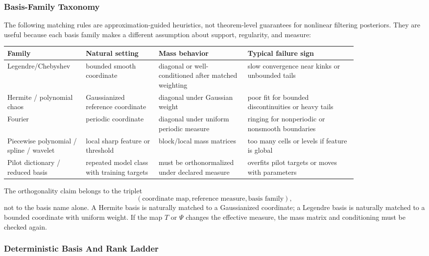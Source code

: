 \documentclass[11pt]{article}
\numberwithin{equation}{section}
\begin{document}
\subsubsection{Basis-Family Taxonomy}

The following matching rules are approximation-guided heuristics, not
theorem-level guarantees for nonlinear filtering posteriors.  They are useful
because each basis family makes a different assumption about support,
regularity, and measure:
\begin{center}
\begin{tabular}{p{0.16\linewidth}p{0.18\linewidth}p{0.22\linewidth}p{0.27\linewidth}}
\toprule
Family & Natural setting & Mass behavior & Typical failure sign\\
\midrule
Legendre/Chebyshev & bounded smooth coordinate & diagonal or well-conditioned after matched weighting & slow convergence near kinks or unbounded tails\\
Hermite / polynomial chaos & Gaussianized reference coordinate & diagonal under Gaussian weight & poor fit for bounded discontinuities or heavy tails\\
Fourier & periodic coordinate & diagonal under uniform periodic measure & ringing for nonperiodic or nonsmooth boundaries\\
Piecewise polynomial / spline / wavelet & local sharp feature or threshold & block/local mass matrices & too many cells or levels if feature is global\\
Pilot dictionary / reduced basis & repeated model class with training targets & must be orthonormalized under declared measure & overfits pilot targets or moves with parameters\\
\bottomrule
\end{tabular}
\end{center}
The orthogonality claim belongs to the triplet
\begin{equation}
    (\text{coordinate map},\text{reference measure},\text{basis family}),
    \label{eq:p33-orthogonality-triplet}
\end{equation}
not to the basis name alone.  A Hermite basis is naturally matched to a
Gaussianized coordinate; a Legendre basis is naturally matched to a bounded
coordinate with uniform weight.  If the map \(T\) or \(\Psi\) changes the
effective measure, the mass matrix and conditioning must be checked again.

\subsubsection{Deterministic Basis And Rank Ladder}
\end{document}
